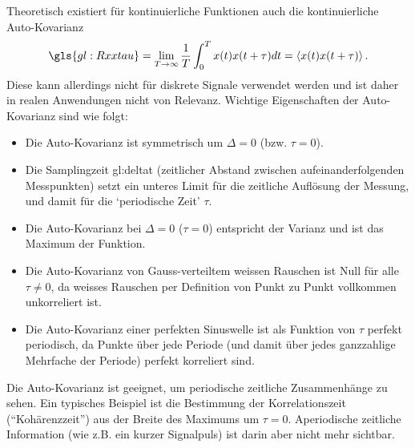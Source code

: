 Theoretisch existiert für kontinuierliche Funktionen auch die kontinuierliche Auto-Kovarianz
\begin{align}
\gls{gl:Rxxtau} = \lim_{T \rightarrow \infty} \frac{1}{T} \int_0^T x(t) x(t + \tau) dt = \langle x(t) x(t + \tau) \rangle \,.
\end{align}
Diese kann allerdings nicht für diskrete Signale verwendet werden und ist daher in realen Anwendungen nicht von Relevanz. Wichtige Eigenschaften der Auto-Kovarianz sind wie folgt:
\begin{itemize}
    \setlength\itemsep{0em}
        \item Die Auto-Kovarianz ist symmetrisch um $\Delta = 0$ (bzw. $\tau = 0$).
        \item Die Samplingzeit \gls{gl:deltat} (zeitlicher Abstand zwischen aufeinanderfolgenden Messpunkten) setzt ein unteres Limit für die zeitliche Auflösung der Messung, und damit für die `periodische Zeit' $\tau$.
        \item Die Auto-Kovarianz bei $\Delta = 0$ ($\tau = 0$) entspricht der Varianz und ist das Maximum der Funktion.
        \item Die Auto-Kovarianz von Gauss-verteiltem weissen Rauschen ist Null f\"ur alle $\tau \neq 0$, da weisses Rauschen per Definition von Punkt zu Punkt vollkommen unkorreliert ist.
        \item Die Auto-Kovarianz einer perfekten Sinuswelle ist als Funktion von $\tau$ perfekt periodisch, da Punkte über jede Periode (und damit über jedes ganzzahlige Mehrfache der Periode) perfekt korreliert sind.
\end{itemize}

Die Auto-Kovarianz ist geeignet, um periodische zeitliche Zusammenhänge zu sehen. Ein typisches Beispiel ist die Bestimmung der Korrelationszeit (``Kohärenzzeit'') aus der Breite des Maximums um $\tau = 0$. Aperiodische zeitliche Information (wie z.B. ein kurzer Signalpuls) ist darin aber nicht mehr sichtbar.

